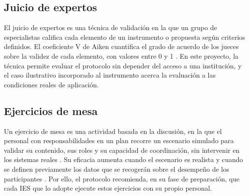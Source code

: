\subsection{Juicio de expertos}
El juicio de expertos es una técnica de validación en la que un grupo de especialistas califica cada elemento de un instrumento o propuesta según criterios definidos. El coeficiente V de Aiken cuantifica el grado de acuerdo de los jueces sobre la validez de cada elemento, con valores entre 0 y 1 \cite{aiken1985}. En este proyecto, la técnica permite evaluar el protocolo sin depender del acceso a una institución, y el caso ilustrativo incorporado al instrumento acerca la evaluación a las condiciones reales de aplicación.

\subsection{Ejercicios de mesa}
Un ejercicio de mesa es una actividad basada en la discusión, en la que el personal con responsabilidades en un plan recorre un escenario simulado para validar su contenido, sus roles y su capacidad de coordinación, sin intervenir en los sistemas reales \cite{nist80084}. Su eficacia aumenta cuando el escenario es realista y cuando se definen previamente los datos que se recogerán sobre el desempeño de los participantes \cite{angafor2023scenario,vykopal2024tabletop}. Por ello, el protocolo recomienda, en su fase de preparación, que cada IES que lo adopte ejecute estos ejercicios con su propio personal.
